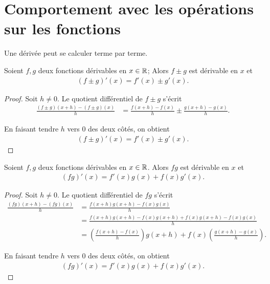 \documentclass[main.tex]{subfiles}
\begin{document}
\section{Comportement avec les opérations sur les fonctions}

Une dérivée peut se calculer terme par terme.

\begin{proposition}

    Soient $f, g$ deux fonctions dérivables en $x \in \mathbb{R}$;
    Alors $f \pm g$ est dérivable en $x$ et
    \begin{align}
        (f \pm g)'(x) = f'(x) \pm g'(x).
    \end{align}
\end{proposition}
\begin{proof}
    Soit $h \neq 0$.
    Le quotient différentiel de $f \pm g$ s'écrit
    \begin{align}
        \frac {(f \pm g)(x + h) - (f \pm g)(x)} h
        &= \frac {f(x + h) - f(x)} h \pm \frac {g(x + h) - g(x)} h.
    \end{align}

    En faisant tendre $h$ vers $0$ des deux côtés,
    on obtient
    \begin{align}
        (f \pm g)'(x) = f'(x) \pm g'(x).
    \end{align}
\end{proof}

\begin{proposition}

    Soient $f, g$ deux fonctions dérivables en $x \in \mathbb{R}$.
    Alors $f g$ est dérivable en $x$ et
    \begin{align}
        (f g)'(x) = f'(x) g(x) + f(x) g'(x).
    \end{align}
\end{proposition}
\begin{proof}
    Soit $h \neq 0$.
    Le quotient différentiel de $f g$ s'écrit
    \begin{align}
        \frac {(f g)(x + h) - (f g)(x)} h
        &= \frac {f(x + h) g(x + h) - f(x) g(x)} h\\
        &= \frac {f(x + h) g(x + h) - f(x) g(x + h) + f(x) g(x + h) - f(x) g(x)} h\\
        &= \left(\frac {f(x + h) - f(x)} h\right) g(x + h) + f(x) \left(\frac {g(x + h) - g(x)} h\right).
    \end{align}

    En faisant tendre $h$ vers $0$ des deux côtés,
    on obtient
    \begin{align}
        (f g)'(x) = f'(x) g(x) + f(x) g'(x).
    \end{align}
\end{proof}
\end{document}
